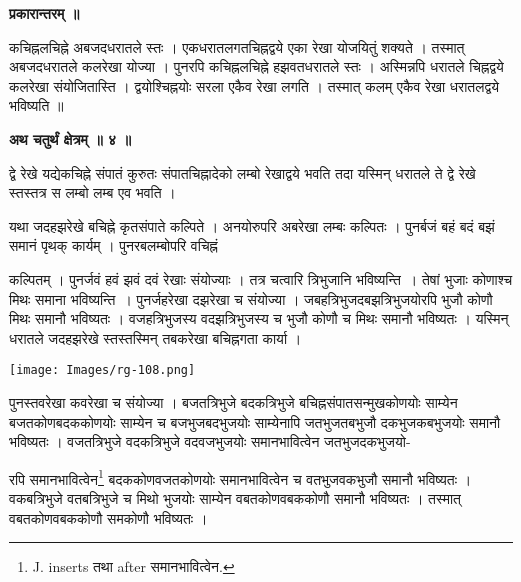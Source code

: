 \documentclass[11pt, openany]{book}
\begin{document}
\newpage
\begin{center}
\textbf{प्रकारान्तरम् ॥}
\end{center}
\vspace{2mm}

कचिह्नलचिह्ने अबजदधरातले स्तः । एकधरातलगतचिह्नद्वये एका रेखा योजयितुं शक्यते । तस्मात् अबजदधरातले कलरेखा योज्या  । पुनरपि कचिह्नलचिह्ने हझवतधरातले स्तः  । अस्मिन्नपि धरातले चिह्नद्वये कलरेखा संयोजितास्ति । द्वयोश्चिह्नयोः सरला एकैव रेखा लगति । तस्मात् कलम् एकैव रेखा धरातलद्वये भविष्यति ॥\\
\begin{center}
\textbf{\large अथ चतुर्थं क्षेत्रम् ॥ ४ ॥}
\end{center}
\vspace{5mm}

{\ab द्वे रेखे यद्येकचिह्ने संपातं कुरुतः संपातचिह्नादेको लम्बो रेखाद्वये भवति तदा यस्मिन् धरातले ते द्वे रेखे स्तस्तत्र स लम्बो लम्ब एव भवति ।}\\
\vspace{3mm}

 यथा जदहझरेखे बचिह्ने कृतसंपाते कल्पिते । अनयोरुपरि अबरेखा लम्बः कल्पितः । पुनर्बजं बहं बदं बझं समानं पृथक् कार्यम् । पुनरबलम्बोपरि वचिह्नं
 \begin{vwcol}[widths={0.65,0.35}, sep=.8cm, rule=0pt] 
  कल्पितम् । पुनर्जवं हवं झवं दवं रेखाः संयोज्याः । तत्र चत्वारि त्रिभुजानि भविष्यन्ति~। तेषां भुजाः कोणाश्च मिथः समाना भविष्यन्ति~। पुनर्जहरेखा दझरेखा च संयोज्या । जबहत्रिभुजदबझत्रिभुजयोरपि भुजौ कोणौ मिथः समानौ भविष्यतः । वजहत्रिभुजस्य वदझत्रिभुजस्य च भुजौ कोणौ च मिथः समानौ भविष्यतः । यस्मिन् धरातले जदहझरेखे स्तस्तस्मिन् तबकरेखा बचिह्नगता कार्या । \\
  \vspace{-3mm}
  
  \noindent \texttt{[image: Images/rg-108.png]}
  \end{vwcol}
  \vspace{-2mm}
  
  \noindent पुनस्तवरेखा कवरेखा च संयोज्या  । बजतत्रिभुजे बदकत्रिभुजे बचिह्नसंपातसन्मुखकोणयोः साम्येन बजतकोणबदककोणयोः साम्येन च बजभुजबदभुजयोः साम्येनापि जतभुजतबभुजौ दकभुजकबभुजयोः समानौ भविष्यतः । वजतत्रिभुजे वदकत्रिभुजे वदवजभुजयोः समानभावित्वेन जतभुजदकभुजयो-

\newpage
\noindent रपि समानभावित्वेन\renewcommand{\thefootnote}{१}\footnote{{\en J. inserts} तथा {\en after} समानभावित्वेन. } बदककोणवजतकोणयोः समानभावित्वेन च वतभुजवकभुजौ समानौ भविष्यतः । वकबत्रिभुजे वतबत्रिभुजे च मिथो भुजयोः साम्येन वबतकोणवबककोणौ समानौ भविष्यतः । तस्मात् वबतकोणवबककोणौ समकोणौ भविष्यतः ।\\
\end{document}
